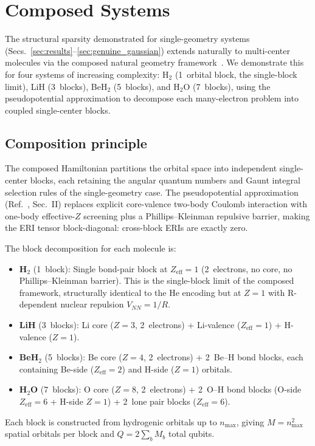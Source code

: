 \documentclass[aps,pra,twocolumn,superscriptaddress,longbibliography]{revtex4-2}
\begin{document}
\section{Composed Systems}
\label{sec:composed}

The structural sparsity demonstrated for single-geometry systems
(Secs.~\ref{sec:results}--\ref{sec:genuine_gaussian}) extends naturally
to multi-center molecules via the composed natural geometry
framework~\cite{loutey_paper17}.  We demonstrate this for four
systems of increasing complexity: H$_2$ (1~orbital block, the
single-block limit), LiH (3~blocks), BeH$_2$ (5~blocks), and H$_2$O
(7~blocks), using the pseudopotential approximation to decompose each
many-electron problem into coupled single-center blocks.


\subsection{Composition principle}
\label{sec:composition_principle}

The composed Hamiltonian partitions the orbital space into independent
single-center blocks, each retaining the angular quantum numbers and
Gaunt integral selection rules of the single-geometry case.  The
pseudopotential approximation (Ref.~\cite{loutey_paper17}, Sec.~II)
replaces explicit core-valence two-body Coulomb interaction with
one-body effective-$Z$ screening plus a Phillips--Kleinman repulsive
barrier, making the ERI tensor block-diagonal: cross-block ERIs are
exactly zero.

The block decomposition for each molecule is:
\begin{itemize}
\item \textbf{H$_2$} (1~block): Single bond-pair block at $Z_{\mathrm{eff}} = 1$
  (2~electrons, no core, no Phillips--Kleinman barrier).  This is the
  single-block limit of the composed framework, structurally identical
  to the He encoding but at $Z = 1$ with R-dependent nuclear repulsion
  $V_{NN} = 1/R$.
\item \textbf{LiH} (3~blocks): Li core ($Z = 3$, 2~electrons) +
  Li-valence ($Z_{\mathrm{eff}} = 1$) + H-valence ($Z = 1$).
\item \textbf{BeH$_2$} (5~blocks): Be core ($Z = 4$, 2~electrons) +
  2~Be--H bond blocks, each containing Be-side
  ($Z_{\mathrm{eff}} = 2$) and H-side ($Z = 1$) orbitals.
\item \textbf{H$_2$O} (7~blocks): O core ($Z = 8$, 2~electrons) +
  2~O--H bond blocks (O-side $Z_{\mathrm{eff}} = 6$ + H-side
  $Z = 1$) + 2~lone pair blocks ($Z_{\mathrm{eff}} = 6$).
\end{itemize}
Each block is constructed from hydrogenic orbitals up to
$n_{\max}$, giving $M = n_{\max}^2$ spatial orbitals per block and
$Q = 2 \sum_b M_b$ total qubits.
\end{document}
